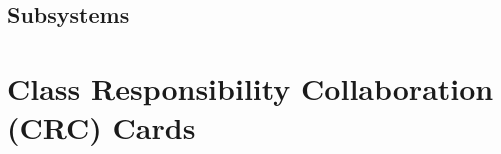 \documentclass[titlepage,12pt]{article}
\begin{document}


\subsection{Subsystems}
\label{sub:subsystems}



    
\section{Class Responsibility Collaboration (CRC) Cards}
\label{sec:class_responsibility_collaboration_crc_cards}

%
%    
\end{document}

